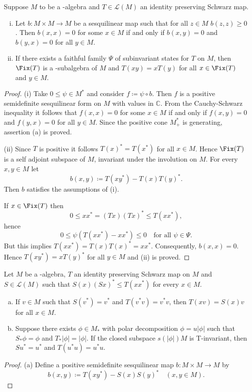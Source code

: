 \begin{lemma}\label{lem:d3-1.1}
Suppose $M$ to be a \CA-algebra and $T\in\mathcal{L}(M)$ an identity preserving Schwarz map.

\begin{enumerate}[(i)]
\item Let $b: M\times M \to M$ be a sesquilinear map such that for all $z\in M$ $b(z,z) \geq 0$.
Then $b(x,x) = 0$ for some $x\in M$ if and only if $b(x,y) = 0$ and $b(y,x) = 0$ for all $y\in M$.

\item If there exists a faithful family $\Psi$ of subinvariant states for $T$ on $M$, then $\Fix(T)$ is a \CA-subalgebra of $M$ and $T(xy) = xT(y)$ for all $x\in\Fix(T)$ and $y\in M$.

\end{enumerate}
\end{lemma}
\begin{proof} 
(i) Take $0 \leq \psi\in M^{*}$ and consider $f \coloneqq \psi\circ b$.
Then $f$ is a positive semidefinite sesquilinear form on $M$ with values in $\mathbb{C}$.
From the Cauchy-Schwarz inequality it follows that $f(x,x) = 0$ for some $x\in M$ if and only if $f(x,y) = 0$ and $f(y,x) = 0$ for all $y\in M$.
Since the positive cone $M^{*}_{+}$ is generating, assertion (a) is proved.

(ii) Since $T$ is positive it follows $T(x)^{*} = T(x^{*})$ for all $x\in M$.
Hence $\Fix(T)$ is a self adjoint subspace of $M$, \ie invariant under the involution on $M$.
For every $x,y\in M$ let
\[
	b(x,y) \coloneqq T(xy^{*}) - T(x)T(y)^{*}.
\]
Then $b$ satisfies the assumptions of (i).

If $x\in\Fix(T)$ then
\[
0 \leq xx^{*} = (Tx)(Tx)^{*} \leq T(xx^{*}),
\]
hence
\[
0 \leq \psi(T(xx^{*}) - xx^{*}) \leq 0 \quad \text{for all } \psi\in\Psi.
\]
But this implies $T(xx^{*}) = T(x)T(x)^{*} = xx^{*}$.
Consequently, $b(x,x) = 0$.
Hence $T(xy^{*}) = xT(y)^{*}$ for all $y\in M$ and (ii) is proved.
\end{proof}

\begin{lemma}\label{lem:d3-1.2}
Let $M$ be a \WA-algebra, $T$ an identity preserving Schwarz map on $M$ and $S\in\mathcal{L}(M)$ such that $S(x)(Sx)^{*} \leq T(xx^{*})$ for every $x\in M$.

\begin{enumerate}[(a)]
\item If $v\in M$ such that $S(v^{*}) = v^{*}$ and $T(v^{*}v) = v^{*}v$, then $T(xv) = S(x)v$ for all $x\in M$.
\item Suppose there exists $\phi\in M_{*}$ with polar decomposition $\phi = u|\phi|$ such that $S_{*}\phi = \phi$ and $T_{*}|\phi| = |\phi|$.
If the closed subspace $s(|\phi|)M$ is T-invariant, then $Su^{*} = u^{*}$ and $T(u^{*}u) = u^{*}u$.
\end{enumerate}
\end{lemma}
\begin{proof}
(a) Define a positive semidefinite sesquilinear map $b: M\times M \to M$ by
\[
b(x,y) \coloneqq T(xy^{*}) - S(x)S(y)^{*} \quad (x,y\in M).
\]
\end{proof}

